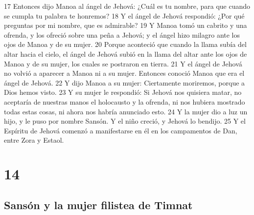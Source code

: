 17 Entonces dijo Manoa al ángel de Jehová: ¿Cuál es tu nombre, para que cuando se cumpla tu palabra te honremos?
18 Y el ángel de Jehová respondió: ¿Por qué preguntas por mi nombre, que es admirable?
19 Y Manoa tomó un cabrito y una ofrenda, y los ofreció sobre una peña a Jehová; y el ángel hizo milagro ante los ojos de Manoa y de su mujer.
20 Porque aconteció que cuando la llama subía del altar hacia el cielo, el ángel de Jehová subió en la llama del altar ante los ojos de Manoa y de su mujer, los cuales se postraron en tierra.
21 Y el ángel de Jehová no volvió a aparecer a Manoa ni a su mujer. Entonces conoció Manoa que era el ángel de Jehová.
22 Y dijo Manoa a su mujer: Ciertamente moriremos, porque a Dios hemos visto.
23 Y su mujer le respondió: Si Jehová nos quisiera matar, no aceptaría de nuestras manos el holocausto y la ofrenda, ni nos hubiera mostrado todas estas cosas, ni ahora nos habría anunciado esto.
24 Y la mujer dio a luz un hijo, y le puso por nombre Sansón. Y el niño creció, y Jehová lo bendijo.
25 Y el Espíritu de Jehová comenzó a manifestarse en él en los campamentos de Dan, entre Zora y Estaol.

\chapter{14}

\section*{Sansón y la mujer filistea de Timnat}

